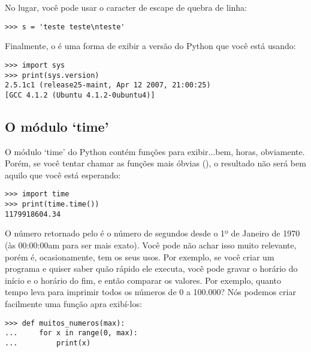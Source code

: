No lugar, você pode usar o caracter de escape de quebra de linha:
\begin{listing}
\begin{verbatim}
>>> s = 'teste teste\nteste'
\end{verbatim}
\end{listing}

\noindent
Finalmente, o  é uma forma de exibir a versão do Python que você está usando:

\begin{listingignore}
\begin{verbatim}
>>> import sys
>>> print(sys.version)
2.5.1c1 (release25-maint, Apr 12 2007, 21:00:25) 
[GCC 4.1.2 (Ubuntu 4.1.2-0ubuntu4)]
\end{verbatim}
\end{listingignore}

\subsection*{O módulo `time'}

O módulo `time' do Python contém funções para exibir$\ldots$bem, horas, obviamente. Porém, se você tentar chamar as funções mais óbvias (), o resultado não será bem aquilo que você está esperando:

\begin{listingignore}
\begin{verbatim}
>>> import time
>>> print(time.time())
1179918604.34
\end{verbatim}
\end{listingignore}

O número retornado pelo  é o número de segundos desde o 1º de Janeiro de 1970 (às 00:00:00am para ser mais exato). Você pode não achar isso muito relevante, porém é, ocasionamente, tem os seus usos. Por exemplo, se você criar um programa e quiser saber quão rápido ele executa, você pode gravar o horário do início e o horário do fim, e então comparar os valores. Por exemplo, quanto tempo leva para imprimir todos os números de 0 a 100.000? Nós podemos criar facilmente uma função apra exibí-los:

\begin{listing}
\begin{verbatim}
>>> def muitos_numeros(max):
...     for x in range(0, max):
...         print(x)
\end{verbatim}
\end{listing}

